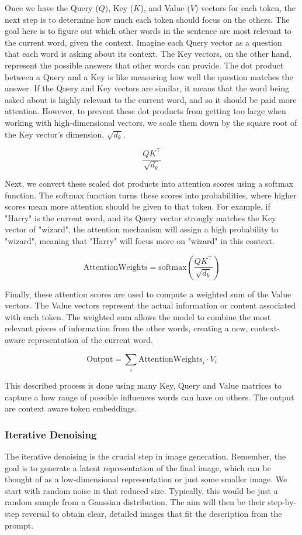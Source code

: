 \documentclass[11pt]{article}
\begin{document}
Once we have the Query ($Q$), Key ($K$), and Value ($V$) vectors for each token, the next step is to determine how much each token should focus on the others. The goal here is to figure out which other words in the sentence are most relevant to the current word, given the context.
Imagine each Query vector as a question that each word is asking about its context. The Key vectors, on the other hand, represent the possible answers that other words can provide. The dot product between a Query and a Key is like measuring how well the question matches the answer. If the Query and Key vectors are similar, it means that the word being asked about is highly relevant to the current word, and so it should be paid more attention.
However, to prevent these dot products from getting too large when working with high-dimensional vectors, we scale them down by the square root of the Key vector's dimension, $\sqrt{d_k}$.

$$\frac{QK^\top}{\sqrt{d_k}}$$

Next, we convert these scaled dot products into attention scores using a softmax function. The softmax function turns these scores into probabilities, where higher scores mean more attention should be given to that token. For example, if "Harry" is the current word, and its Query vector strongly matches the Key vector of "wizard", the attention mechanism will assign a high probability to "wizard", meaning that "Harry" will focus more on "wizard" in this context.

$$\mathrm{Attention Weights} = \mathrm{softmax}\left(\frac{QK^\top}{\sqrt{d_k}}\right)$$

Finally, these attention scores are used to compute a weighted sum of the Value vectors. The Value vectors represent the actual information or content associated with each token. The weighted sum allows the model to combine the most relevant pieces of information from the other words, creating a new, context-aware representation of the current word.

$$\mathrm{Output} = \sum_i \mathrm{Attention Weights}_i \cdot V_i$$

This described process is done using many Key, Query and Value matrices to capture a how range of possible influences words can have on others. The output are context aware token embeddings.

\subsubsection{Iterative Denoising}
The iterative denoising is the crucial step in image generation. Remember, the goal is to generate a latent representation of the final image, which can be thought of as a low-dimensional representation or just some smaller image. We start with random noise in that reduced size. Typically, this would be just a random sample from a Gaussian distribution. The aim will then be their step-by-step reversal to obtain clear, detailed images that fit the description from the prompt.
\end{document}
